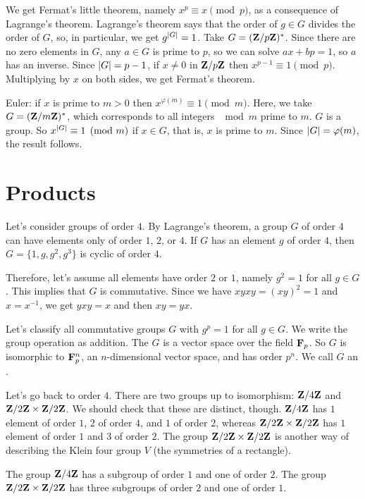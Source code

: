 \documentclass[11pt, oneside]{amsart}
\begin{document}
We get Fermat's little theorem, namely $x^p \equiv x\pmod p$, as a consequence of Lagrange's theorem. Lagrange's theorem says that the order of $g\in G$ divides the order of $G$, so, in particular, we get $g^{\left \lvert G \right \rvert} = 1$. Take $G = (\mathbf Z/p\mathbf Z)^*$. Since there are no zero elements in $G$, any $a\in G$ is prime to $p$, so we can solve $ax + bp = 1$, so $a$ has an inverse. Since $\left \lvert G \right \rvert = p-1$, if $x\neq 0$ in $\mathbf Z/p\mathbf Z$ then $x^{p-1} \equiv 1 \pmod p$. Multiplying by $x$ on both sides, we get Fermat's theorem.

Euler: if $x$ is prime to $m>0$ then $x^{\varphi( m)} \equiv 1\pmod m$. Here, we take $G = (\mathbf Z/m\mathbf Z)^*$, which corresponds to all integers $\mod m $ prime to $m$. $G$ is a group. So $x^{\left \lvert G \right \rvert} \equiv 1\pmod m$ if $x\in G$, that is, $x$ is prime to $m$. Since $\left \lvert G \right \rvert = \varphi (m)$, the result follows.
 
\section{Products}
Let's consider groups of order $4$. By Lagrange's theorem, a group $G$ of order $4$ can have elements only of order $1$, $2$, or $4$. If $G$ has an element $g$ of order $4$, then $G = \{1,g,g^2, g^3\}$ is cyclic of order $4$. 

Therefore, let's assume all elements have order $2$ or $1$, namely $g^2=1$ for all $g\in G$. This implies that $G$ is commutative. Since we have $xyxy = (xy)^2 = 1$ and $x = x^{-1}$, we get $yxy=x$ and then $xy = yx$.

Let's classify all commutative groups $G$ with $g^p=1$ for all $g\in G$. We write the group operation as addition. The $G$ is a vector space over the field $\mathbf F_p$. So $G$ is isomorphic to $\mathbf F_p^n$, an $n$-dimensional vector space, and has order $p^n$. We call $G$ an . 

Let's go back to order $4$. There are two groups up to isomorphism: $\mathbf Z/4\mathbf Z$ and $\mathbf Z/2\mathbf Z\times \mathbf Z/2\mathbf Z$. We should check that these are distinct, though. $\mathbf Z/4\mathbf Z$ has $1$ element of order $1$, $2$ of order $4$, and $1$ of order $2$, whereas $\mathbf Z/2\mathbf Z\times \mathbf Z/2\mathbf Z$ has $1$ element of order $1$ and $3$ of order $2$. The group $\mathbf Z/2\mathbf Z\times \mathbf Z/2\mathbf Z$ is another way of describing the Klein four group $V$ (the symmetries of a rectangle). 

The group $\mathbf Z/4\mathbf Z$ has a subgroup of order $1$ and one of order $2$. The group $\mathbf Z/2\mathbf Z\times \mathbf Z/2\mathbf Z$ has three subgroups of order $2$ and one of order $1$. 
\end{document}
